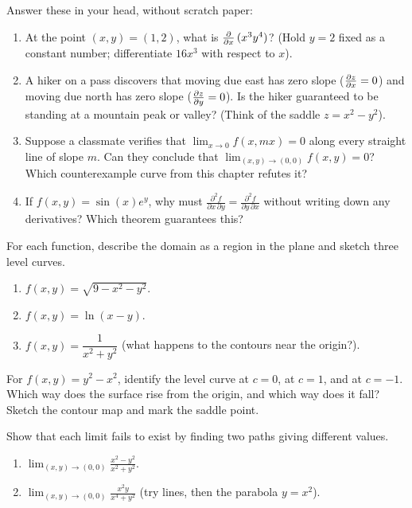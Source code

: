 \begin{exercise}
\label{ch32:exc-mental-checks}
Answer these in your head, without scratch paper:
\begin{enumerate}[label=(\alph*)]
  \item At the point $(x,y)=(1,2)$, what is $\frac{\partial }{\partial x}\,(x^3 y^4)$? (Hold $y=2$ fixed as a constant number; differentiate $16x^3$ with respect to $x$).
  \item A hiker on a pass discovers that moving due east has zero slope ($\frac{\partial z}{\partial x}=0$) and moving due north has zero slope ($\frac{\partial z}{\partial y}=0$). Is the hiker guaranteed to be standing at a mountain peak or valley? (Think of the saddle $z=x^2-y^2$).
  \item Suppose a classmate verifies that $\lim_{x\to 0} f(x, mx) = 0$ along every straight line of slope $m$. Can they conclude that $\lim_{(x,y)\to(0,0)} f(x,y) = 0$? Which counterexample curve from this chapter refutes it?
  \item If $f(x,y) = \sin(x) e^y$, why must $\frac{\partial^2 f}{\partial x\,\partial y} = \frac{\partial^2 f}{\partial y\,\partial x}$ without writing down any derivatives? Which theorem guarantees this?
\end{enumerate}
\end{exercise}

\begin{exercise}
\label{ch32:exc-domain}
For each function, describe the domain as a region in the plane and sketch three level curves.
\begin{enumerate}[label=(\alph*)]
  \item $f(x,y)=\sqrt{9-x^2-y^2}$.
  \item $f(x,y)=\ln(x-y)$.
  \item $f(x,y)=\dfrac{1}{x^2+y^2}$ (what happens to the contours near the origin?).
\end{enumerate}
\end{exercise}

\begin{exercise}
\label{ch32:exc-saddle}
For $f(x,y)=y^2-x^2$, identify the level curve at $c=0$, at $c=1$, and at $c=-1$. Which way does
the surface rise from the origin, and which way does it fall? Sketch the contour map and mark the
saddle point.
\end{exercise}

\begin{exercise}
\label{ch32:exc-twopath}
Show that each limit fails to exist by finding two paths giving different values.
\begin{enumerate}[label=(\alph*)]
  \item $\displaystyle\lim_{(x,y)\to(0,0)} \frac{x^2-y^2}{x^2+y^2}$.
  \item $\displaystyle\lim_{(x,y)\to(0,0)} \frac{x^2 y}{x^4+y^2}$ (try lines, then the parabola
  $y=x^2$).
\end{enumerate}
\end{exercise}

